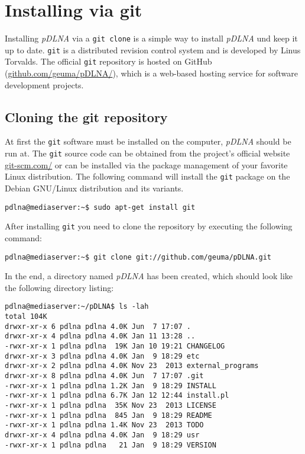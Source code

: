 \section{Installing via git}
\label{install-git}

Installing {\em pDLNA} via a \verb|git clone| is a simple way to install {\em pDLNA} und keep it up to date. \verb|git| is a distributed revision control system and is developed by Linus Torvalds. The official \verb|git| repository is hosted on GitHub (\url{github.com/geuma/pDLNA/}), which is a web-based hosting service for software development projects.

\subsection{Cloning the git repository}

At first the \verb|git| software must be installed on the computer, {\em pDLNA} should be run at. The \verb|git| source code can be obtained from the project's official website \url{git-scm.com/} or can be installed via the package management of your favorite Linux distribution. The following command will install the \verb|git| package on the Debian GNU/Linux distribution and its variants.
\begin{lstlisting}
pdlna@mediaserver:~$ sudo apt-get install git
\end{lstlisting}

After installing \verb|git| you need to clone the repository by executing the following command:
\begin{lstlisting}
pdlna@mediaserver:~$ git clone git://github.com/geuma/pDLNA.git
\end{lstlisting}
In the end, a directory named {\em pDLNA} has been created, which should look like the following directory listing:
\begin{lstlisting}
pdlna@mediaserver:~/pDLNA$ ls -lah
total 104K
drwxr-xr-x 6 pdlna pdlna 4.0K Jun  7 17:07 .
drwxr-xr-x 4 pdlna pdlna 4.0K Jan 11 13:28 ..
-rwxr-xr-x 1 pdlna pdlna  19K Jan 10 19:21 CHANGELOG
drwxr-xr-x 3 pdlna pdlna 4.0K Jan  9 18:29 etc
drwxr-xr-x 2 pdlna pdlna 4.0K Nov 23  2013 external_programs
drwxr-xr-x 8 pdlna pdlna 4.0K Jun  7 17:07 .git
-rwxr-xr-x 1 pdlna pdlna 1.2K Jan  9 18:29 INSTALL
-rwxr-xr-x 1 pdlna pdlna 6.7K Jan 12 12:44 install.pl
-rwxr-xr-x 1 pdlna pdlna  35K Nov 23  2013 LICENSE
-rwxr-xr-x 1 pdlna pdlna  845 Jan  9 18:29 README
-rwxr-xr-x 1 pdlna pdlna 1.4K Nov 23  2013 TODO
drwxr-xr-x 4 pdlna pdlna 4.0K Jan  9 18:29 usr
-rwxr-xr-x 1 pdlna pdlna   21 Jan  9 18:29 VERSION
\end{lstlisting}

